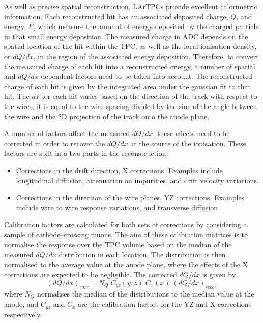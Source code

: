 As well as precise spatial reconstruction, LArTPCs provide excellent
calorimetric information. Each reconstructed hit has an associated deposited 
charge, $Q$, and energy, $E$, which measure the amount of energy deposited by 
the charged particle in that small energy deposition. The measured charge in ADC
depends on the spatial location of the hit within the TPC, as well as the 
local ionisation density, or $dQ/dx$, in the region of the associated energy 
deposition. Therefore, to convert the measured charge of each hit into a 
reconstructed energy, a number of spatial and $dQ/dx$ dependent factors need 
to be taken into account. The reconstructed charge of each hit is given by 
the integrated area under the gaussian fit to that hit. The $dx$ for each hit 
varies based on the direction of the track with respect to the wires, it is 
equal to the wire spacing divided by the sine of the angle between the wire 
and the 2D projection of the track onto the anode plane.

A number of factors affect the measured $dQ/dx$, these effects need to be 
corrected in order to recover the $dQ/dx$ at the source of the ionisation. 
These factors are split into two parts in the \protodune{} reconstruction:
\begin{itemize}
	\item Corrections in the drift direction, X corrections. Examples include 
		longitudinal diffusion, attenuation on impurities, and drift velocity
		variations.
	\item Corrections in the direction of the wire planes, YZ corrections.
		Examples include wire to wire response variations, and transverse diffusion.
\end{itemize}
Calibration factors are calculated for both sets of corrections by considering a
sample of cathode--crossing muons. The aim of these calibration matrices is to 
normalise the response over the TPC volume based on the median of the measured
$dQ/dx$ distribution in each location. The distribution is then normalised to 
the average value at the anode plane, where the effects of the X corrections are
expected to be negligible. The corrected $dQ/dx$ is given by
\begin{equation*}
	\left( dQ/dx \right)_{corr} = N_Q \; C_{yz}(y, z) \; C_x(x) \; \left( dQ/dx
	\right)_{reco},
\end{equation*}
where $N_Q$ normalises the median of the distributions to the median value at
the anode, and $C_{yz}$ and $C_{x}$ are the calibration factors for the YZ and 
X corrections respectively.

